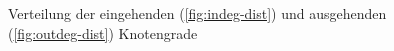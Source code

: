 \begin{figure}[t]
  \centering
  \caption{Verteilung der eingehenden (\ref{fig:indeg-dist}) und
    ausgehenden (\ref{fig:outdeg-dist}) Knotengrade}
  \label{fig:comsizedist}
\end{figure}

